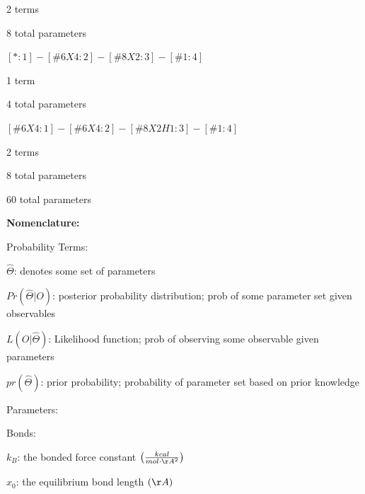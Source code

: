 \documentclass{report}
\begin{document}
\begin{outline}
\begin{outline}
\begin{outline}
\begin{outline}
            \item{2 terms}
            \item{8 total parameters}
          \end{outline}
        \item{$[*:1]-[\#6X4:2]-[\#8X2:3]-[\#1:4]$}
          \begin{outline}
            \item{1 term}
            \item{4 total parameters}
          \end{outline}
        \item{$[\#6X4:1]-[\#6X4:2]-[\#8X2H1:3]-[\#1:4]$}
          \begin{outline}
            \item{2 terms}
            \item{8 total parameters}
          \end{outline}  
      \end{outline}
    \item{60 total parameters}
  \end{outline}
  \item{\bf Nomenclature:}
    \begin{outline}
    \item{Probability Terms:}
      \begin{outline}
        \item{$\hat{\Theta}$: denotes some set of parameters}
        \item{$Pr\left(\hat{\Theta}|O \right)$: posterior probability distribution; prob of some parameter set given observables}
        \item{$L\left(O|\hat{\Theta} \right)$: Likelihood function; prob of observing some observable given parameters}
        \item{$pr\left(\hat{\Theta} \right)$: prior probability; probability of parameter set based on prior knowledge}
      \end{outline}
    \item{Parameters:}
      \begin{outline}
        \item{Bonds:}
          \begin{outline}
            \item{$k_{B}$: the bonded force constant $\left(\frac{kcal}{mol \cdot \AA^2} \right)$}
            \item{$x_0$: the equilibrium bond length $\left(\AA \right)$}
          \end{outline}

\end{outline}
\end{outline}
\end{outline}
\end{document}
